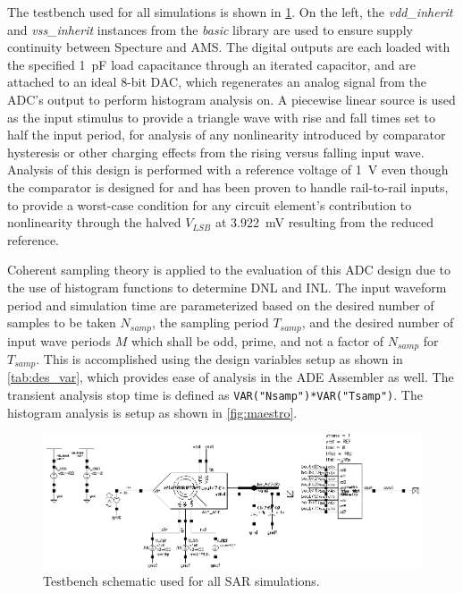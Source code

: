 \documentclass[11pt,letterpaper]{article}
\begin{document}
The testbench used for all simulations is shown in \cref{fig:tb_sar}. On the left, the \emph{vdd\_inherit} and \emph{vss\_inherit} instances from the \emph{basic} library are used to ensure supply continuity between Specture and AMS\@. The digital outputs are each loaded with the specified \qty{1}{\pF} load capacitance through an iterated capacitor, and are attached to an ideal 8-bit DAC, which regenerates an analog signal from the ADC's output to perform histogram analysis on. A piecewise linear source is used as the input stimulus to provide a triangle wave with rise and fall times set to half the input period, for analysis of any nonlinearity introduced by comparator hysteresis or other charging effects from the rising versus falling input wave. Analysis of this design is performed with a reference voltage of \qty{1}{\V} even though the comparator is designed for and has been proven to handle rail-to-rail inputs, to provide a worst-case condition for any circuit element's contribution to nonlinearity through the halved \(V_{LSB}\) at \qty{3.922}{\mV} resulting from the reduced reference.

Coherent sampling theory is applied to the evaluation of this ADC design due to the use of histogram functions to determine DNL and INL\@. The input waveform period and simulation time are parameterized based on the desired number of samples to be taken \(N_{samp}\), the sampling period \(T_{samp}\), and the desired number of input wave periods \(M\) which shall be odd, prime, and not a factor of \(N_{samp}\) for \(T_{samp}\). This is accomplished using the design variables setup as shown in \cref{tab:des_var}, which provides ease of analysis in the ADE Assembler as well. The transient analysis stop time is defined as \texttt{VAR("Nsamp")*VAR("Tsamp")}. The histogram analysis is setup as shown in \cref{fig:maestro}.

\begin{figure}[htbp!]
		\centering
	    \includegraphics[width=\textwidth]{images/tb_sar.eps}
		\caption{Testbench schematic used for all SAR simulations.}\label{fig:tb_sar}
\end{figure}
\end{document}
